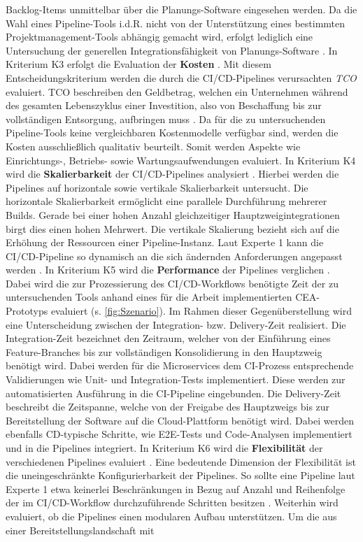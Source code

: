 Backlog-Items unmittelbar über die Planungs-Software eingesehen werden. Da die Wahl eines Pipeline-Tools i.d.R. nicht von der Unterstützung eines bestimmten Projektmanagement-Tools abhängig gemacht wird, erfolgt lediglich eine Untersuchung der generellen Integrationsfähigkeit von Planungs-Software \cite[Z. 89 ff.]{TestDeveloperSAPHyperspaceAdoption&Onboarding.}. In Kriterium K3 erfolgt die Evaluation der \textbf{Kosten} \cite[Z. 43]{ProductManagerSAPHyperspaceCICD.}. Mit diesem Entscheidungskriterium werden die durch die CI/CD-Pipelines verursachten \textit{\ac{TCO}} evaluiert. TCO beschreiben den Geldbetrag, welchen ein Unternehmen während des gesamten Lebenszyklus einer Investition, also von Beschaffung bis zur vollständigen Entsorgung, aufbringen muss \cite[3]{Ellram.1993}. Da für die zu untersuchenden Pipeline-Tools keine vergleichbaren Kostenmodelle verfügbar sind, werden die Kosten ausschließlich qualitativ beurteilt. Somit werden Aspekte wie Einrichtungs-, Betriebs- sowie Wartungsaufwendungen evaluiert. In Kriterium K4 wird die \textbf{Skalierbarkeit} der CI/CD-Pipelines analysiert \cite[Z. 69 ff.]{ProductOwnerSAPBTPProd&Infra.}. Hierbei werden die Pipelines auf horizontale sowie vertikale Skalierbarkeit untersucht. Die horizontale Skalierbarkeit ermöglicht eine parallele Durchführung mehrerer Builds. Gerade bei einer hohen Anzahl gleichzeitiger Hauptzweigintegrationen birgt dies einen hohen Mehrwert. Die vertikale Skalierung bezieht sich auf die Erhöhung der Ressourcen einer Pipeline-Instanz. Laut Experte 1 kann die CI/CD-Pipeline so dynamisch an die sich ändernden Anforderungen angepasst werden \cite[Z. 70 ff.]{ProductOwnerSAPBTPProd&Infra.}. In Kriterium K5 wird die \textbf{Performance} der Pipelines verglichen \cite[Z. 36 ff.]{ProductManagerSAPHyperspaceCICD.}. Dabei wird die zur Prozessierung des CI/CD-Workflows benötigte Zeit der zu untersuchenden Tools anhand eines für die Arbeit implementierten CEA-Prototyps evaluiert (s. \ref{fig:Szenario}). Im Rahmen dieser Gegenüberstellung wird eine Unterscheidung zwischen der Integration- bzw. Delivery-Zeit realisiert. Die Integration-Zeit bezeichnet den Zeitraum, welcher von der Einführung eines Feature-Branches bis zur vollständigen Konsolidierung in den Hauptzweig benötigt wird. Dabei werden für die Microservices dem CI-Prozess entsprechende Validierungen wie Unit- und Integration-Tests implementiert. Diese werden zur automatisierten Ausführung in die CI-Pipeline eingebunden. Die Delivery-Zeit beschreibt die Zeitspanne, welche von der Freigabe des Hauptzweigs bis zur Bereitstellung der Software auf die Cloud-Plattform benötigt wird. Dabei werden ebenfalls CD-typische Schritte, wie E2E-Tests und Code-Analysen implementiert und in die Pipelines integriert. In Kriterium K6 wird die \textbf{Flexibilität} der verschiedenen Pipelines evaluiert \cite[Z. 65 ff.]{ProductOwnerSAPBTPProd&Infra.}. Eine bedeutende Dimension der Flexibilität ist die uneingeschränkte Konfigurierbarkeit der Pipelines. So sollte eine Pipeline laut Experte 1 etwa keinerlei Beschränkungen in Bezug auf Anzahl und Reihenfolge der im CI/CD-Workflow durchzuführende Schritten besitzen \cite[Z. 65 ff.]{ProductOwnerSAPBTPProd&Infra.}. Weiterhin wird evaluiert, ob die Pipelines einen modularen Aufbau unterstützen. Um die aus einer Bereitstellungslandschaft mit 